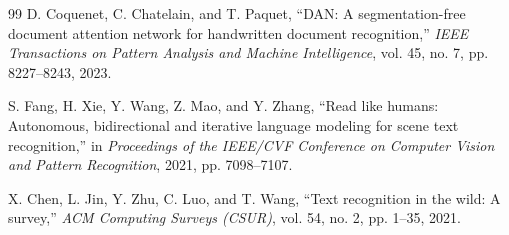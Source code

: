 \documentclass[11pt]{article}
\begin{document}
\begin{thebibliography}{99}
D. Coquenet, C. Chatelain, and T. Paquet, ``DAN: A segmentation-free document attention network for handwritten document recognition,'' \textit{IEEE Transactions on Pattern Analysis and Machine Intelligence}, vol. 45, no. 7, pp. 8227--8243, 2023.

S. Fang, H. Xie, Y. Wang, Z. Mao, and Y. Zhang, ``Read like humans: Autonomous, bidirectional and iterative language modeling for scene text recognition,'' in \textit{Proceedings of the IEEE/CVF Conference on Computer Vision and Pattern Recognition}, 2021, pp. 7098--7107.

X. Chen, L. Jin, Y. Zhu, C. Luo, and T. Wang, ``Text recognition in the wild: A survey,'' \textit{ACM Computing Surveys (CSUR)}, vol. 54, no. 2, pp. 1--35, 2021.

\end{thebibliography}
\end{document}
